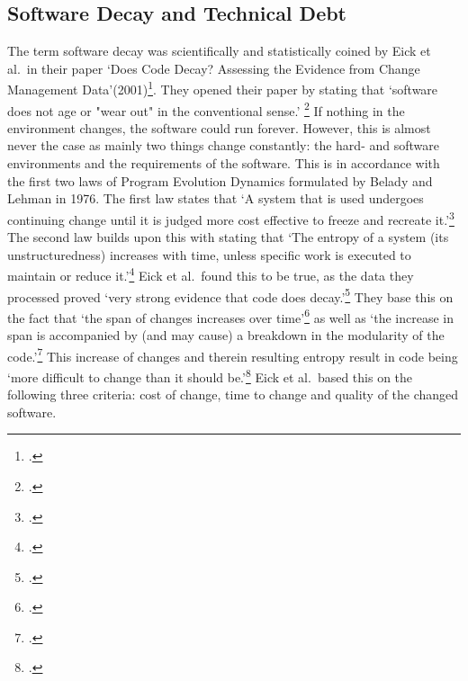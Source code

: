 \subsection{Software Decay and Technical Debt}
The term software decay was scientifically and statistically coined by Eick et al.\ in their paper `Does Code Decay? Assessing the Evidence from Change Management Data'(2001)\footcite{eickDoesCodeDecay2001}. They opened their paper by stating that `software does not age or "wear out" in the conventional sense.' \footcite[1]{eickDoesCodeDecay2001}
If nothing in the environment changes, the software could run forever. However, this is almost never the case as mainly two things change constantly: the hard- and software environments and the requirements of the software.
This is in accordance with the first two laws of Program Evolution Dynamics formulated by Belady and Lehman in 1976.
The first law states that `A system that is used undergoes continuing change until it is judged more cost effective to freeze and recreate it.'\footcite[228]{beladyModelLargeProgram1976}
The second law builds upon this with stating that `The entropy of a system (its unstructuredness) increases with time, unless specific work is executed to maintain or reduce it.'\footcite[228]{beladyModelLargeProgram1976}
Eick et al.\ found this to be true, as the data they processed proved `very strong evidence that code does decay.'\footcite[7]{eickDoesCodeDecay2001}
They base this on the fact that `the span of changes increases over time'\footcite[7]{eickDoesCodeDecay2001} as well as `the increase in span is accompanied by (and may cause) a breakdown in the modularity of the code.'\footcite[7]{eickDoesCodeDecay2001}
This increase of changes and therein resulting entropy result in code being `more difficult to change than it should be.'\footcite[3]{eickDoesCodeDecay2001}
Eick et al.\ based this on the following three criteria: cost of change, time to change and quality of the changed software. 